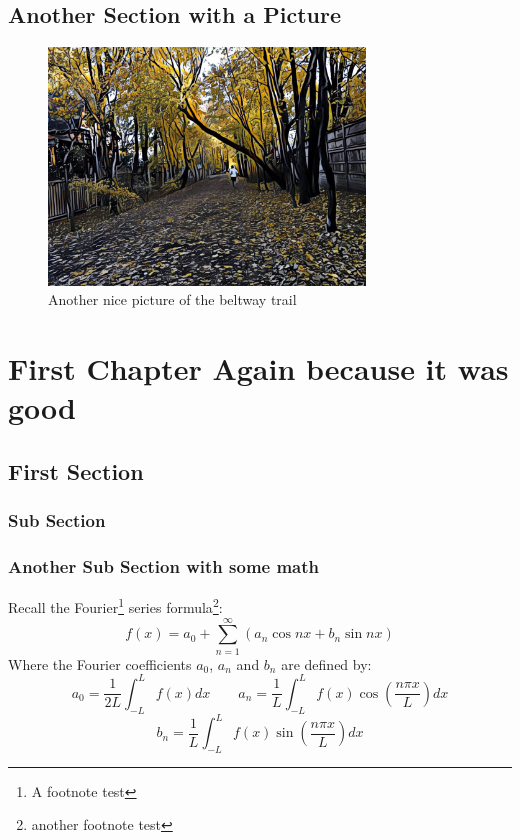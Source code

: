 \documentclass[11pt,letterpaper,twoside]{book}
\begin{document}
\lipsum[8]

\section{Another Section with a Picture}


\lipsum[95]
\begin{figure}
\centering
\includegraphics[width=0.75\textwidth]{TrailPic2}
\caption{\label{fig:pathB}Another nice picture of the beltway trail}
\end{figure}

\lipsum[10-11]


\chapter{First Chapter Again because it was good}

\lipsum[11-14]

\section{First Section}

\lipsum[63]

\subsection{Sub Section}

\lipsum[41-45]

\subsection{Another Sub Section with some math}

\lipsum[16-17]
Recall the Fourier\footnote{A footnote test} series formula\footnote{another footnote test \lipsum[1]}:
\[
f(x) = a_0 + \sum_{n = 1}^\infty \left( a_n \cos nx + b_n \sin nx \right)
\]
Where the Fourier coefficients $a_0$, $a_n$ and $b_n$ are defined by:
\[
a_0 = \frac{1}{2L} \int_{-L}^L f(x) dx  \qquad
a_n = \frac{1}{L}  \int_{-L}^L f(x) \cos \left( \frac{n\pi x}{L} \right) dx 
\]
\[
b_n = \frac{1}{L}  \int_{-L}^L f(x) \sin \left( \frac{n\pi x}{L} \right) dx 
\]
\lipsum[88]
\end{document}
